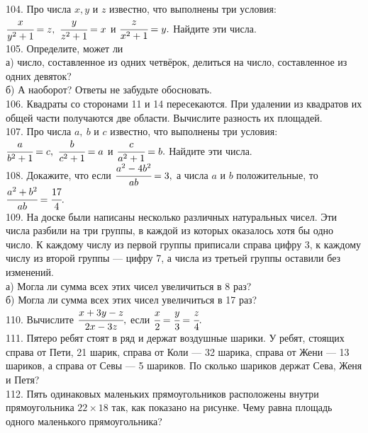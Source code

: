 \documentclass[12pt]{article}
\begin{document}
104. Про числа $x, y$ и $z$ известно, что выполнены три условия: $\cfrac{x}{y^2+1}=z,\ \cfrac{y}{z^2+1}=x$ и $\cfrac{z}{x^2+1}=y.$ Найдите эти числа.\\
105. Определите, может ли\\
а) число, составленное из одних четвёрок, делиться на число, составленное из одних девяток?\\
б) А наоборот? Ответы не забудьте обосновать.\\
106. Квадраты со сторонами 11 и 14 пересекаются. При удалении из квадратов их общей части получаются две области. Вычислите разность их площадей.\\
107. Про числа $a,\ b$ и $c$ известно, что выполнены три условия: $\cfrac{a}{b^2+1}=c,\ \cfrac{b}{c^2+1}=a$ и $\cfrac{c}{a^2+1}=b.$ Найдите эти числа.\\
108. Докажите, что если $\cfrac{a^2-4b^2}{ab}=3,$ а числа $a$ и $b$ положительные, то $\cfrac{a^2+b^2}{ab}=\cfrac{17}{4}.$\\
109. На доске были написаны несколько различных натуральных чисел. Эти числа разбили на три группы, в каждой из которых оказалось хотя бы одно число.
К каждому числу из первой группы приписали справа цифру 3, к каждому числу из второй группы --- цифру 7, а числа из третьей группы оставили без изменений.\\
а) Могла ли сумма всех этих чисел увеличиться в 8 раз?\\
б) Могла ли сумма всех этих чисел увеличиться в 17 раз?\\
110. Вычислите $\cfrac{x+3y-z}{2x-3z},$ если $\cfrac{x}{2}=\cfrac{y}{3}=\cfrac{z}{4}.$\\
111. Пятеро ребят стоят в ряд и держат воздушные шарики. У ребят, стоящих справа от Пети, 21 шарик, справа от Коли --- 32 шарика, справа от Жени --- 13 шариков, а справа от Севы --- 5 шариков. По сколько шариков держат Сева, Женя и Петя?\\
112. Пять одинаковых маленьких прямоугольников расположены внутри прямоугольника $22\times18$ так, как показано на рисунке. Чему равна площадь одного маленького прямоугольника?\\
\end{document}
